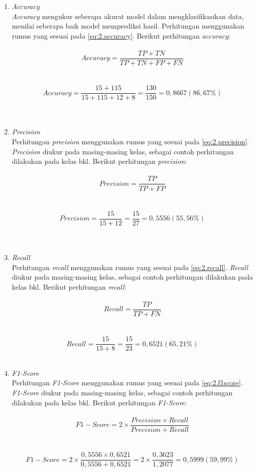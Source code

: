 \begin{enumerate}[noitemsep]
	\item \textit{Accuracy} \\
    \textit{Accuracy} mengukur seberapa akurat model dalam mengklasifikasikan 
    data, menilai seberapa baik model memprediksi hasil. Perhitungan 
    menggunakan rumus yang sesuai pada \ref{eq:2.accuracy}. Berikut 
    perhitungan \textit{accuracy}:\\ \\
    $$Accuracy = \frac{TP + TN}{TP + TN + FP + FN}$$ \\ \\
    $$Accuracy = \frac{15 + 115}{15 + 115 + 12 + 8} = \frac{130}{150} = 0,8667 (86,67\%)$$ \\ \\

    \item \textit{Precision} \\
    Perhitungan \textit{precision} menggunakan rumus yang sesuai pada 
    \ref{eq:2.precision}. \textit{Precision} diukur pada masing-masing kelas, 
    sebagai contoh perhitungan dilakukan pada kelas bkl. Berikut perhitungan 
    \textit{precision}: \\ \\
    $$Precision = \frac{TP}{TP + FP}$$ \\ \\
    $$Precision = \frac{15}{15 + 12} = \frac{15}{27} = 0,5556 (55,56\%)$$ \\ \\ 

    \item \textit{Recall} \\
    Perhitungan \textit{recall} menggunakan rumus yang sesuai pada 
    \ref{eq:2.recall}. \textit{Recall} diukur pada masing-masing kelas, 
    sebagai contoh perhitungan dilakukan pada kelas bkl. Berikut perhitungan 
    \textit{recall}: \\ \\
    $$Recall = \frac{TP}{TP + FN}$$ \\ \\
    $$Recall = \frac{15}{15 + 8} = \frac{15}{23} = 0,6521 (65,21\%)$$ \\

    \item \textit{F1-Score} \\
    Perhitungan \textit{F1-Score} menggunakan rumus yang sesuai pada 
    \ref{eq:2.f1score}. \textit{F1-Score} diukur pada masing-masing kelas, 
    sebagai contoh perhitungan dilakukan pada kelas bkl. Berikut perhitungan 
    \textit{F1-Score}: \\ \\
    $$F1-Score = 2 \times \frac{Precision \times Recall}{Precision + Recall}$$ \\ \\
    $$F1-Score = 2 \times \frac{0,5556 \times 0,6521}{0,5556 + 0,6521} = 2 \times \frac{0,3623}{1,2077} = 0,5999 (59,99\%)$$ \\
\end{enumerate}

